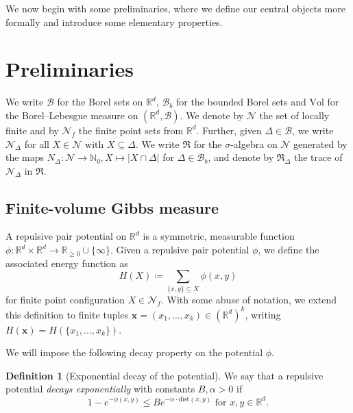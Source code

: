 \documentclass[10pt]{amsart}
\theoremstyle{definition}
\newtheorem{definition}[theorem]{Definition}
\theoremstyle{remark}
\newcommand{\pointsets}{\mathcal{N}}
\newcommand{\events}{\mathfrak{R}}
\newcommand{\dist}{\mathrm{dist}}
\newcommand{\N}{\mathbb{N}}
\newcommand{\R}{\mathbb{R}}
\newcommand{\potential}{\phi}
\newcommand{\borel}{\mathcal{B}}
\newcommand{\size}[1]{\left\lvert#1\right\rvert}
\newcommand{\vol}{\mathrm{Vol}}
\newcommand{\V}[1]{\mathbf{#1}}
\begin{document}
	We now begin with some preliminaries, where we define our central objects more formally and introduce some elementary properties.
	
	
	
	
	
	
	\section{Preliminaries}
	We write $\borel$ for the Borel sets on $\R^{d}$, $\borel_b$ for the bounded Borel sets and $\vol$ for the Borel--Lebesgue measure on $(\R^d, \borel)$.
	We denote by $\pointsets$ the set of locally finite and by $\pointsets_f$ the finite point sets from $\R^d$.
	Further, given $\Delta \in \borel$, we write $\pointsets_{\Delta}$ for all $X \in \pointsets$ with $X \subseteq \Delta$.
	We write $\events$ for the $\sigma$-algebra on $\pointsets$ generated by the maps $N_{\Delta}: \pointsets \to \N_0, X \mapsto \size{X \cap \Delta}$ for $\Delta \in \borel_b$, and denote by $\events_{\Delta}$ the trace of $\pointsets_{\Delta}$ in $\events$. 
	
	
	
	\subsection{Finite-volume Gibbs measure}\label{sec:finite-volume-prelims}
	A repulsive pair potential on $\R^d$ is a symmetric, measurable function $\potential: \R^d \times \R^d \to \R_{\ge 0} \cup \{\infty\}$.
	Given a repulsive pair potential $\potential$, we define the associated energy function as  
	\[
	H(X) \coloneqq \sum_{\{x, y\} \subseteq X} \potential(x, y) 
	\]
	for finite point configuration $X \in \pointsets_f$.
	With some abuse of notation, we extend this definition to finite tuples $\V{x} = (x_1, \dots, x_k) \in (\R^d)^k$, writing $H(\V{x}) = H(\{x_1, \dots, x_k\})$.
	
	
	We will impose the following decay property on the potential $\phi$.
	\begin{definition}[Exponential decay of the potential]\label{def:potential_decay}
		We say that a repulsive potential \emph{decays exponentially} with constants $B, \alpha > 0$ if
		\[
		1 - e^{-\potential(x, y)} \le B  e^{- \alpha  \cdot\dist(x, y)} \text{ for } x, y \in \R^d.
		\]
	\end{definition}
	
\end{document}
